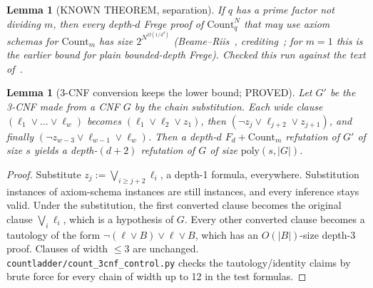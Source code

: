 \documentclass[11pt]{article}
\newtheorem{lemma}[theorem]{Lemma}
\theoremstyle{definition}
\newcommand{\Count}{\mathrm{Count}}
\begin{document}
\begin{lemma}[KNOWN THEOREM, separation]\label{lem:br}
If $q$ has a prime factor not dividing $m$, then every depth-$d$ Frege proof of $\Count^N_q$ that may use axiom schemas for
$\Count_m$ has size $2^{N^{\Omega(1/4^d)}}$ (Beame--Riis~\cite[Cor.~9.3]{BR98}, crediting~\cite{BIKPRS96}; for $m=1$ this is
the earlier bound for plain bounded-depth Frege). Checked this run against the text of~\cite{BR98}.
\end{lemma}

\begin{lemma}[3-CNF conversion keeps the lower bound; PROVED]\label{lem:conv}
Let $G'$ be the 3-CNF made from a CNF $G$ by the chain substitution. Each wide clause $(\ell_1\vee\dots\vee\ell_w)$ becomes
$(\ell_1\vee\ell_2\vee z_1)$, then $(\neg z_j\vee\ell_{j+2}\vee z_{j+1})$, and finally $(\neg z_{w-3}\vee\ell_{w-1}\vee\ell_w)$.
Then a depth-$d$ $F_d+\Count_m$ refutation of $G'$ of size $s$ yields a depth-$(d+2)$ refutation of $G$ of size
$\mathrm{poly}(s,|G|)$.
\end{lemma}
\begin{proof}
Substitute $z_j:=\bigvee_{i\ge j+2}\ell_i$, a depth-1 formula, everywhere. Substitution instances of axiom-schema instances are
still instances, and every inference stays valid. Under the substitution, the first converted clause becomes the original
clause $\bigvee_i\ell_i$, which is a hypothesis of $G$. Every other converted clause becomes a tautology of the form
$\neg(\ell\vee B)\vee\ell\vee B$, which has an $O(|B|)$-size depth-3 proof. Clauses of width $\le3$ are unchanged.
\texttt{countladder/count\_3cnf\_control.py} checks the tautology/identity claims by brute force for every chain of width up to 12 in the
test formulas.
\end{proof}
\end{document}
